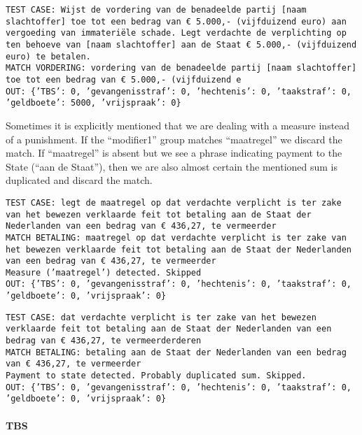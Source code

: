 \documentclass[a4paper]{article}
\begin{document}
\texttt{TEST CASE: %
Wijst de vordering van de benadeelde partij [naam slachtoffer] toe tot een bedrag van € 5.000,- (vijfduizend euro) aan vergoeding van immateriële schade. Legt verdachte de verplichting op ten behoeve van [naam slachtoffer] aan de Staat € 5.000,- (vijfduizend euro) te betalen.\\
MATCH VORDERING: vordering van de benadeelde partij [naam slachtoffer] toe tot een bedrag van € 5.000,- (vijfduizend e\\
OUT: \{'TBS': 0, 'gevangenisstraf': 0, 'hechtenis': 0, 'taakstraf': 0, 'geldboete': 5000, 'vrijspraak': 0\}}


Sometimes it is explicitly mentioned that we are dealing with a measure instead of a punishment.
If the ``modifier1'' group matches ``maatregel'' we discard the match.
If ``maatregel'' is absent but we see a phrase indicating payment to the State (``aan de Staat''), then we are also almost certain the mentioned sum is duplicated and discard the match.

\texttt{TEST CASE: %
legt de maatregel op dat verdachte verplicht is ter zake van het bewezen verklaarde feit tot betaling aan de Staat der Nederlanden van een bedrag van € 436,27, te vermeerder\\
MATCH BETALING: maatregel op dat verdachte verplicht is ter zake van het bewezen verklaarde feit tot betaling aan de Staat der Nederlanden van een bedrag van € 436,27, te vermeerder\\
Measure ('maatregel') detected. Skipped\\
OUT: \{'TBS': 0, 'gevangenisstraf': 0, 'hechtenis': 0, 'taakstraf': 0, 'geldboete': 0, 'vrijspraak': 0\}}

\texttt{TEST CASE: %
dat verdachte verplicht is ter zake van het bewezen verklaarde feit tot betaling aan de Staat der Nederlanden van een bedrag van € 436,27, te vermeerderderen\\
MATCH BETALING: betaling aan de Staat der Nederlanden van een bedrag van € 436,27, te vermeerder\\
Payment to state detected. Probably duplicated sum. Skipped.\\
OUT: \{'TBS': 0, 'gevangenisstraf': 0, 'hechtenis': 0, 'taakstraf': 0, 'geldboete': 0, 'vrijspraak': 0\}}

\paragraph{TBS}
\end{document}

